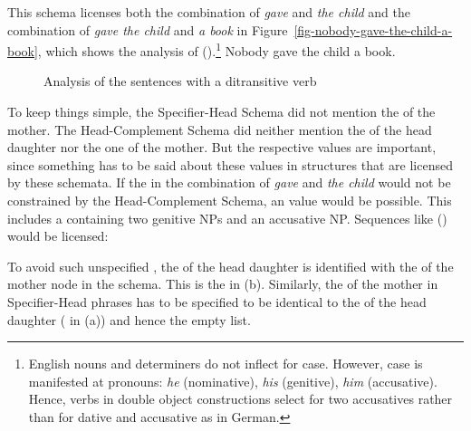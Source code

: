 This schema licenses both the combination of \emph{gave} and \emph{the child} and the combination of
\emph{gave the child} and \emph{a book} in Figure~\vref{fig-nobody-gave-the-child-a-book}, which shows the
analysis of ().\footnote{%
  English nouns and determiners do not inflect for case. However, case is manifested at pronouns:
  \emph{he} (nominative), \emph{his} (genitive), \emph{him} (accusative). Hence, verbs in double object
  constructions select for two accusatives rather than for dative and accusative as in German. 
}
\ea
\label{ex-nobody-gave-the-child-a-book}
Nobody gave the child a book.
\z
\begin{figure}
\caption{\label{fig-nobody-gave-the-child-a-book}Analysis of the sentences with a ditransitive verb}
\end{figure}

To keep things simple, the Specifier-Head Schema did not mention the \compsv of the mother. The
Head-Complement Schema did neither mention the \sprv of the head daughter nor the one of the mother. But the
respective values are important, since something has to be said about these values in structures
that are licensed by these schemata. If the \sprv in the combination of \emph{gave} and \emph{the
  child} would not be constrained by the Head-Complement Schema, an value would be possible. This
includes a \sprl containing two genitive NPs and an accusative NP. Sequences like () would be
licensed:

\z
To avoid such unspecified \sprvs, the \sprv of the head daughter is identified with the \sprv of the
mother node in the schema. This is the  in (b). Similarly, the \compsv of the mother
in Specifier-Head phrases has to be specified to be identical to the \compsv of the head daughter
( in (a)) and hence the empty list.

